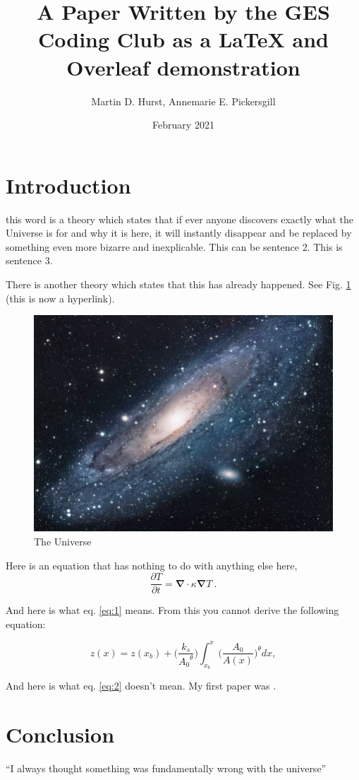 \documentclass[12pt,a4paper]{article}
\title{A Paper Written by the GES Coding Club as a LaTeX and Overleaf demonstration}
\author{Martin D. Hurst, Annemarie E. Pickersgill}
\date{February 2021}
\begin{document}
\maketitle

\section{Introduction}
this word is a theory which states that if ever anyone discovers exactly what the Universe is for and why it is here, it will instantly disappear and be replaced by something even more bizarre and inexplicable.
This can be sentence 2.
This is sentence 3.


There is another theory which states that this has already happened. See Fig. \ref{fig:universe} (this is now a hyperlink). 

\begin{figure}[h!]
\centering
\includegraphics[scale=1.7]{universe}
\caption{The Universe}
\label{fig:universe}
\end{figure}

Here is an equation that has nothing to do with anything else here,
\begin{equation}
    \label{eq:1}
    \dfrac{\partial T}{\partial t} = \boldsymbol{\nabla} \cdot \kappa \boldsymbol{\nabla} T \ .
\end{equation}

And here is what eq. \eqref{eq:1} means. From this you cannot derive the following equation:

\begin{equation} \label{eq:2}
    z(x) = z(x_b) + \Bigg(\frac{k_s}{{A_0}^{\theta}}\Bigg) \int_{x_b}^{x} \Bigg(\frac{A_0}{A(x)}\Bigg)^{\theta} dx,
\end{equation}  

And here is what eq. \eqref{eq:2} doesn't mean. My first paper was \citet{Hurst2012}.

\section{Conclusion}
``I always thought something was fundamentally wrong with the universe'' \citep{adams1995hitchhiker}



\end{document}
